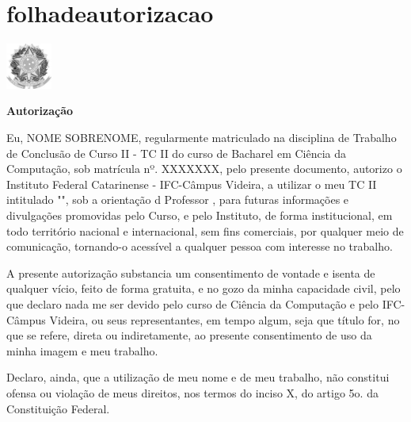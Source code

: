 \chapter{folhadeautorizacao}

  \begin{center}
  \vspace*{1 cm}
  \vspace{-2cm}
   \centering\includegraphics[width=1.5cm]{brasaoRepublicaPeB.jpg}
   \vspace{-0.5 cm}
    {\large \SingleSpacing \imprimirinstituicao}
    \vspace{-0.5cm}
    \center{ \hrulefill}
    
     {\large \SingleSpacing \textbf{Autorização}}
    
    
    \vspace*{1 cm}
    
    \vspace*{0.5 cm}
    
   \end{center}
   


Eu, NOME SOBRENOME, regularmente matriculado na disciplina de Trabalho de Conclusão de Curso II - TC II do curso de Bacharel em Ciência da Computação, sob matrícula nº. XXXXXXX, pelo presente documento, autorizo o Instituto Federal Catarinense - IFC-Câmpus Videira, a utilizar o meu TC II intitulado "\imprimirtitulo", sob a orientação d Professor \imprimirorientador, para futuras informações e divulgações promovidas pelo Curso, e pelo Instituto, de forma institucional, em todo território nacional e internacional, sem fins comerciais, por qualquer meio de comunicação, tornando-o acessível a qualquer pessoa com interesse no trabalho.

A presente autorização substancia um consentimento de vontade e isenta de qualquer vício, feito de forma gratuita, e no gozo da minha capacidade civil, pelo que declaro nada me ser devido pelo curso de Ciência da Computação e pelo IFC-Câmpus Videira, ou seus representantes, em tempo algum, seja que título for, no que se refere, direta ou indiretamente, ao presente consentimento de uso da minha imagem e meu trabalho.

Declaro, ainda, que a utilização de meu nome e de meu trabalho, não constitui ofensa ou violação de meus direitos, nos termos do inciso X, do artigo 5o. da Constituição Federal.

